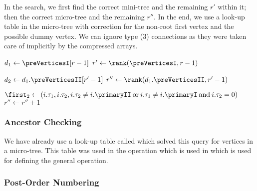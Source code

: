 In the search, we first find the correct mini-tree and the remaining $r'$ within it; then the correct micro-tree and the remaining $r''$.
In the end, we use a look-up table in the micro-tree with correction for the non-root first vertex and the possible dummy vertex.
We can ignore type (3) connections as they were taken care of implicitly by the compressed arrays.

\begin{algorithm}
\begin{algorithmic}
	\State $d_1 \gets \preVerticesI[r - 1]$ 
	\State $r' \gets \rank(\preVerticesI, r - 1)$

	\State $d_2 \gets d_1.\preVerticesII[r' - 1]$ 
	\State $r'' \gets \rank(d_1.\preVerticesII, r' - 1)$
	
	\Statex
	
	\State $\first_2 \gets (i.\tau_1, i.\tau_2, i.\tau_2 \ne i.\primaryII \boolor i.\tau_1 \ne i.\primaryI \booland i.\tau_2 = 0)$
		\State $r'' \gets r'' + 1$ 
	\EndIf
	
	\State {}
\EndFunction
\end{algorithmic}
\end{algorithm}

\subsubsection{Ancestor Checking}

We have already use a look-up table called \isAncestor{} which solved this query for vertices in a micro-tree.
This table was used in the operation \subtreeSize{} which is used in \preRank{} which is used for defining the general \isAncestor{} operation.

\begin{algorithm}
\begin{algorithmic}
	\State {}
\EndFunction
\end{algorithmic}
\end{algorithm}

\subsubsection{Post-Order Numbering}

